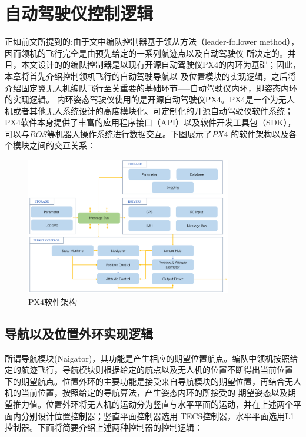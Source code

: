 %
%
%
%

\chapter{自动驾驶仪控制逻辑}
\label{chap:single_control_logic}
正如前文所提到的:由于文中编队控制器基于领从方法（leader-follower method），因而领机的飞行完全是由预先给定的一系列航迹点以及自动驾驶仪
所决定的。并且，本文设计的的编队控制器是以现有开源自动驾驶仪PX4的内环为基础；因此，本章将首先介绍控制领机飞行的自动驾驶导航以
及位置模块的实现逻辑，之后将介绍固定翼无人机编队飞行至关重要的基础环节-----自动驾驶仪内环，即姿态内环的实现逻辑。
内环姿态驾驶仪使用的是开源自动驾驶仪PX4。PX4是一个为无人机或者其他无人系统设计的高度模块化、可定制化的开源自动驾驶仪软件系统；
PX4软件本身提供了丰富的应用程序接口（API）以及软件开发工具包（SDK），可以与$ROS$等机器人操作系统进行数据交互。下图展示了$PX4$
的软件架构以及各个模块之间的交互关系：
\begin{figure}[H]
    \centering
    \includegraphics[width=0.8\textwidth]{figures/c4/PX4_archticher.png}
    \caption{PX4软件架构}\label{fig:PX4_archticher.png}
\end{figure}
\section{导航以及位置外环实现逻辑}
所谓导航模块(Naigator)，其功能是产生相应的期望位置航点。编队中领机按照给定的航迹飞行，导航模块则根据给定的航点以及无人机的位置不断得出当前位置
下的期望航点。位置外环的主要功能是接受来自导航模块的期望位置，再结合无人机的当前位置，按照给定的导航算法，产生姿态内环的所接受的
期望姿态以及期望推力值。位置外环将无人机的运动分为竖直与水平平面的运动，并在上述两个平面内分别设计位置控制器；竖直平面控制器选用
TECS控制器，水平平面选用L1控制器。下面将简要介绍上述两种控制器的控制逻辑：
